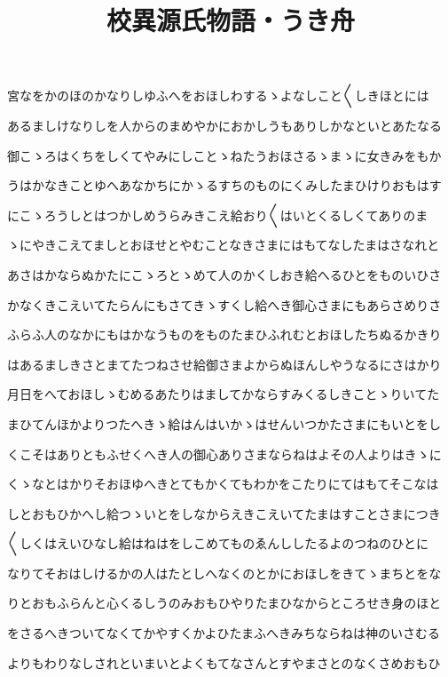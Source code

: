 \documentclass[a4paper,11pt,landscape]{ltjtarticle}
\title{校異源氏物語・うき舟}
\date{}
\begin{document}
\maketitle

宮なをかのほのかなりしゆふへをおほしわするゝよなしこと〱しきほとには
\par\medskip
あるましけなりしを人からのまめやかにおかしうもありしかなといとあたなる
\par\medskip
御こゝろはくちをしくてやみにしことゝねたうおほさるゝまゝに女きみをもか
\par\medskip
うはかなきことゆへあなかちにかゝるすちのものにくみしたまひけりおもはす
\par\medskip
にこゝろうしとはつかしめうらみきこえ給おり〱はいとくるしくてありのま
\par\medskip
ゝにやきこえてましとおほせとやむことなきさまにはもてなしたまはさなれと
\par\medskip
あさはかならぬかたにこゝろとゝめて人のかくしおき給へるひとをものいひさ
\par\medskip
かなくきこえいてたらんにもさてきゝすくし給へき御心さまにもあらさめりさ
\par\medskip
ふらふ人のなかにもはかなうものをものたまひふれむとおほしたちぬるかきり
\par\medskip
はあるましきさとまてたつねさせ給御さまよからぬほんしやうなるにさはかり
\par\medskip
月日をへておほしゝむめるあたりはましてかならすみくるしきことゝりいてた
\par\medskip
まひてんほかよりつたへきゝ給はんはいかゝはせんいつかたさまにもいとをし
\par\medskip
くこそはありともふせくへき人の御心ありさまならねはよその人よりはきゝに
\par\medskip
くゝなとはかりそおほゆへきとてもかくてもわかをこたりにてはもてそこなは
\par\medskip
しとおもひかへし給つゝいとをしなからえきこえいてたまはすことさまにつき
\par\medskip
〱しくはえいひなし給はねはをしこめてものゑんししたるよのつねのひとに
\par\medskip
なりてそおはしけるかの人はたとしへなくのとかにおほしをきてゝまちとをな
\par\medskip
りとおもふらんと心くるしうのみおもひやりたまひなからところせき身のほと
\par\medskip
をさるへきついてなくてかやすくかよひたまふへきみちならねは神のいさむる
\par\medskip
よりもわりなしされといまいとよくもてなさんとすやまさとのなくさめおもひ
\end{document}
